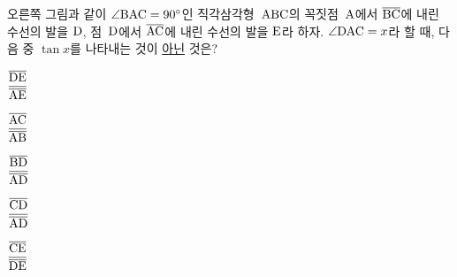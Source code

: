 \noindent\begin{minipage}[t]{0.58\linewidth}\vspace{0pt}\raggedright 오른쪽 그림과 같이 $\angle\mathrm{BAC}=90^\circ$인 직각삼각형~$\mathrm{ABC}$의 꼭짓점~$\mathrm{A}$에서 $\overline{\mathrm{BC}}$에 내린 수선의 발을 $\mathrm{D}$, 점~$\mathrm{D}$에서 $\overline{\mathrm{AC}}$에 내린 수선의 발을 $\mathrm{E}$라 하자. $\angle\mathrm{DAC}=x$라 할 때, 다음 중 $\tan x$를 나타내는 것이 \underline{아닌} 것은?\end{minipage}\hfill\begin{minipage}[t]{0.4\linewidth}\vspace{0pt}\centering \resizebox{\ifdim\width>\linewidth\linewidth\else\width\fi}{!}{}\end{minipage}\par
\begin{choices32}{\rule[-3ex]{0pt}{8ex}$\dfrac{\overline{\mathrm{DE}}}{\overline{\mathrm{AE}}}$}{\rule[-3ex]{0pt}{8ex}$\dfrac{\overline{\mathrm{AC}}}{\overline{\mathrm{AB}}}$}{\rule[-3ex]{0pt}{8ex}$\dfrac{\overline{\mathrm{BD}}}{\overline{\mathrm{AD}}}$}{\rule[-3ex]{0pt}{8ex}$\dfrac{\overline{\mathrm{CD}}}{\overline{\mathrm{AD}}}$}{\rule[-3ex]{0pt}{8ex}$\dfrac{\overline{\mathrm{CE}}}{\overline{\mathrm{DE}}}$}\end{choices32}
